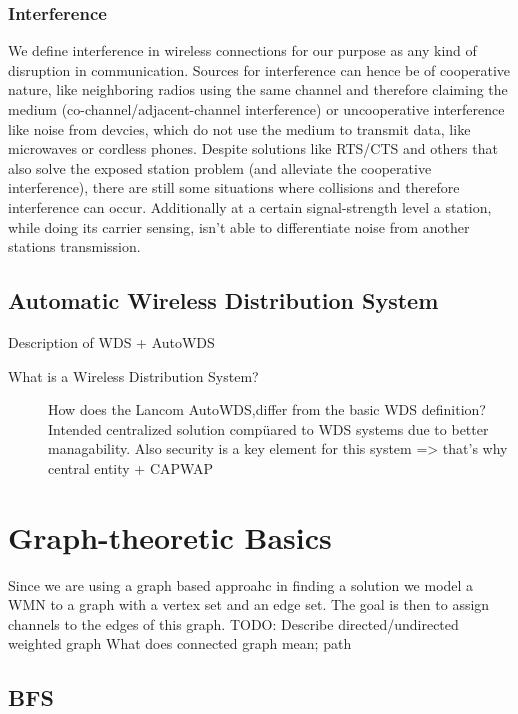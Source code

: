       \subsubsection{Interference}
	We define interference in wireless connections for our purpose as any kind of disruption in communication. Sources for interference can hence be
	of cooperative nature, like neighboring radios using the same channel and therefore claiming the medium (co-channel/adjacent-channel interference)
	or uncooperative interference like noise from devcies, which do not use the medium to transmit data, like microwaves or cordless phones.
	Despite solutions like RTS/CTS and others that also solve the exposed station problem (and alleviate the cooperative interference),
	there are still some situations where collisions and therefore interference can occur.
	Additionally at a certain signal-strength level a station, while doing its carrier sensing, isn't able to differentiate noise from another stations transmission.
	      
    \subsection{Automatic Wireless Distribution System}
    Description of WDS + AutoWDS \newline
      \begin{description}
       \item[What is a Wireless Distribution System?]
       How does the Lancom \ac{AutoWDS},differ from the basic WDS definition?
	 Intended centralized solution compüared to WDS systems due to better managability.
	 Also security is a key element for this system => that's why central entity + CAPWAP
      \end{description}

\section{Graph-theoretic Basics}
  Since we are using a graph based approahc in finding a solution we model a \ac{WMN} to a graph with a vertex set and an edge set. The goal is then to assign channels
  to the edges of this graph.
  TODO: Describe directed/undirected weighted graph
  What does connected graph mean; path
  \subsection{\ac{BFS}}

